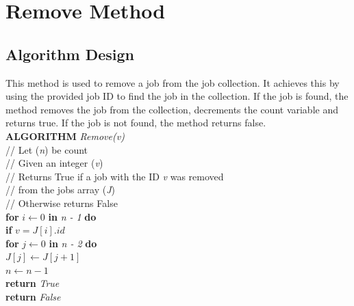 \documentclass[12pt,a4paper]{article}
\begin{document}
	\section{Remove Method}
		\subsection{Algorithm Design}
			This method is used to remove a job from the job collection. It achieves this by using the 
			provided job ID to find the job in the collection. If the job is found, the method removes the 
			job from the collection, decrements the count variable and returns true. If the job is not found, 
			the method returns false.\\

			\textbf{ALGORITHM} \textit{Remove(v)}\\
			\null\hspace{1cm}// Let (\textit{n}) be count\\
			\null\hspace{1cm}// Given an integer (\textit{v})\\
			\null\hspace{1cm}// Returns True if a job with the ID \textit{v} was removed\\
			\null\hspace{1cm}// from the jobs array (\textit{J})\\
			\null\hspace{1cm}// Otherwise returns False\\
			\null\hspace{1cm}\textbf{for} \textit{$i \gets 0$} \textbf{in} \textit{n - 1} \textbf{do}\\
			\null\hspace{2cm}\textbf{if} \textit{$v = J[i].id$}\\
			\null\hspace{4cm}\textbf{for} \textit{$j \gets 0$} \textbf{in} \textit{n - 2} \textbf{do}\\
			\null\hspace{5cm}\textit{$J[j] \gets J[j + 1]$}\\
			\null\hspace{4cm}\textit{$n \gets n - 1$}\\
			\null\hspace{4cm}\textbf{return} \textit{True}\\
			\null\hspace{1cm}\textbf{return} \textit{False}\\
			
\end{document}
